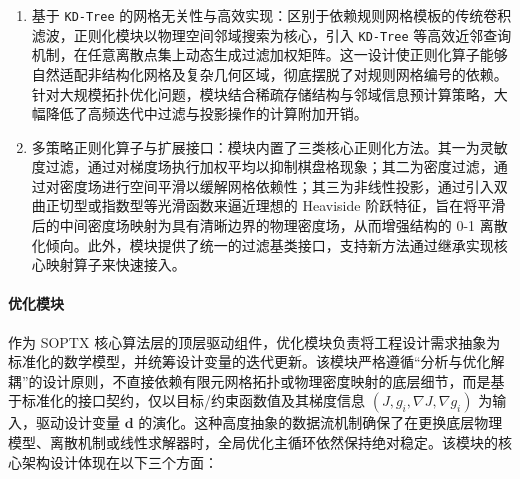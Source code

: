 \begin{enumerate}
	\item 基于 \texttt{KD-Tree} 的网格无关性与高效实现：区别于依赖规则网格模板的传统卷积滤波，正则化模块以物理空间邻域搜索为核心，引入 \texttt{KD-Tree} 等高效近邻查询机制，在任意离散点集上动态生成过滤加权矩阵。这一设计使正则化算子能够自然适配非结构化网格及复杂几何区域，彻底摆脱了对规则网格编号的依赖。针对大规模拓扑优化问题，模块结合稀疏存储结构与邻域信息预计算策略，大幅降低了高频迭代中过滤与投影操作的计算附加开销。
	
	\item 多策略正则化算子与扩展接口：模块内置了三类核心正则化方法。其一为灵敏度过滤，通过对梯度场执行加权平均以抑制棋盘格现象；其二为密度过滤，通过对密度场进行空间平滑以缓解网格依赖性；其三为非线性投影，通过引入双曲正切型或指数型等光滑函数来逼近理想的 Heaviside 阶跃特征，旨在将平滑后的中间密度场映射为具有清晰边界的物理密度场，从而增强结构的 0-1 离散化倾向。此外，模块提供了统一的过滤基类接口，支持新方法通过继承实现核心映射算子来快速接入。
\end{enumerate}

\paragraph*{优化模块}

作为 SOPTX 核心算法层的顶层驱动组件，优化模块负责将工程设计需求抽象为标准化的数学模型，并统筹设计变量的迭代更新。该模块严格遵循“分析与优化解耦”的设计原则，不直接依赖有限元网格拓扑或物理密度映射的底层细节，而是基于标准化的接口契约，仅以目标/约束函数值及其梯度信息 $(J, g_i, \nabla J, \nabla g_i)$ 为输入，驱动设计变量 $\boldsymbol{d}$ 的演化。这种高度抽象的数据流机制确保了在更换底层物理模型、离散机制或线性求解器时，全局优化主循环依然保持绝对稳定。该模块的核心架构设计体现在以下三个方面：


